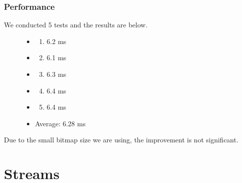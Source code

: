 \documentclass[letterpaper,10pt,english]{sphinxmanual}
\begin{document}
\subsection{Performance}
\label{RTACM/RTACM:id2}\begin{description}
\item[{We conducted 5 tests and the results are below.}] \leavevmode\begin{itemize}
\item {} \begin{enumerate}
\item {} 
6.2 ms

\end{enumerate}

\item {} \begin{enumerate}
\setcounter{enumi}{1}
\item {} 
6.1 ms

\end{enumerate}

\item {} \begin{enumerate}
\setcounter{enumi}{2}
\item {} 
6.3 ms

\end{enumerate}

\item {} \begin{enumerate}
\setcounter{enumi}{3}
\item {} 
6.4 ms

\end{enumerate}

\item {} \begin{enumerate}
\setcounter{enumi}{4}
\item {} 
6.4 ms

\end{enumerate}

\item {} 
Average: 6.28 ms

\end{itemize}

\end{description}

Due to the small bitmap size we are using, the improvement is not significant.


\chapter{Streams}
\label{Streams/Streams:streams}\label{Streams/Streams::doc}
\end{document}
